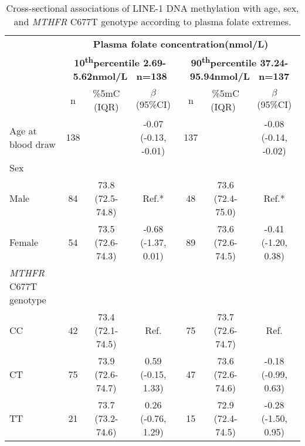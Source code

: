 \begin{flushleft}
\begin{table}
\caption{Cross-sectional associations of LINE-1 DNA methylation with age, sex, and \emph{MTHFR} C677T genotype according to plasma folate extremes.}\label{table3_2}\tablehead{}
\begin{adjustbox}{width=\textwidth}
\renewcommand{\arraystretch}{1.6}
\begin{tabular}{lcccccc}
\hline 
~ &\multicolumn{6}{c}{\centering \textbf{Plasma folate concentration(nmol/L)}}\\
\bfseries
&\multicolumn{3}{c}{\parbox[t]{3cm}{\centering \textbf{ 10\textsuperscript{th}percentile 2.69-5.62nmol/L \ n=138\\}}} 
&\multicolumn{3}{c}{\parbox[t]{3cm}{\centering \textbf{ 90\textsuperscript{th}percentile 37.24-95.94nmol/L \ n=137\\}}}\\
~ & n & \%5mC (IQR) & $\beta $ (95\%CI) & n &{ \%5mC (IQR)}~ & $\beta $ (95\%CI)\\
\hline
 Age at blood draw & 138 &~ & {}-0.07 (-0.13, -0.01) & 137 &~ & {}-0.08 (-0.14, -0.02)\\
 Sex &~ &~ &~ &~ &~ &~\\ \quad Male & 84 & 73.8 (72.5-74.8) & Ref.* & 48 & 73.6 (72.4-75.0) & Ref.*\\ \quad Female & 54 & 73.5 (72.6-74.3) & {}-0.68 (-1.37, 0.01) & 89 & 73.6 (72.6-74.5) & {}-0.41 (-1.20, 0.38)\\
 {\textit{MTHFR}}{ C677T genotype}&~ &~ &~ &~ &~ &~\\ \quad CC & 42 & 73.4 (72.1-74.5) & Ref. & 75 & 73.7 (72.6-74.7) & Ref.\\ \quad CT & 75 & 73.9 (72.6-74.7) & 0.59 (-0.15, 1.33) & 47 & 73.6 (72.6-74.6) & {}-0.18 (-0.99, 0.63)\\ \quad TT & 21 & 73.7 (73.2-74.6) & 0.26 (-0.76, 1.29) & 15 & 72.9 (72.4-74.5) & {}-0.28 (-1.50, 0.95)\\
\hline 
\end{tabular}
\end{adjustbox}
\end{table}
\end{flushleft}




